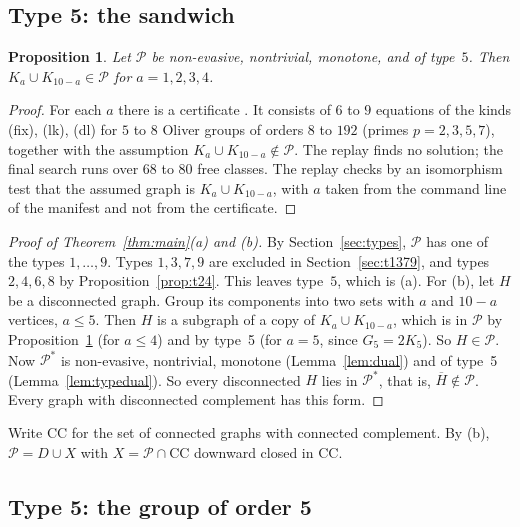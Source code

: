 \documentclass[11pt]{article}
\theoremstyle{plain}
\newtheorem{proposition}[theorem]{Proposition}
\theoremstyle{definition}
\theoremstyle{remark}
\newcommand{\PP}{\mathcal P}
\newcommand{\file}[1]{\path{#1}}
\begin{document}
\subsection{Type 5: the sandwich}\label{sec:t5}

\begin{proposition}\label{prop:A}
Let $\PP$ be non-evasive, nontrivial, monotone, and of type~$5$.
Then $K_a\cup K_{10-a}\in\PP$ for $a=1,2,3,4$.
\end{proposition}

\begin{proof}
For each $a$ there is a certificate \file{certs/type5_force_K<a>_K<10-a>.json}.
It consists of $6$ to $9$ equations of the kinds (fix), (lk), (dl) for $5$ to $8$ Oliver groups of orders $8$ to $192$ (primes $p=2,3,5,7$), together with the assumption $K_a\cup K_{10-a}\notin\PP$.
The replay finds no solution; the final search runs over $68$ to $80$ free classes.
The replay checks by an isomorphism test that the assumed graph is $K_a\cup K_{10-a}$, with $a$ taken from the command line of the manifest and not from the certificate.
\end{proof}

\begin{proof}[Proof of Theorem~\ref{thm:main}(a) and (b)]
By Section~\ref{sec:types}, $\PP$ has one of the types $1,\dots,9$. Types $1,3,7,9$ are excluded in Section~\ref{sec:t1379}, and types $2,4,6,8$ by Proposition~\ref{prop:t24}. This leaves type~$5$, which is (a).
For (b), let $H$ be a disconnected graph.
Group its components into two sets with $a$ and $10-a$ vertices, $a\le5$.
Then $H$ is a subgraph of a copy of $K_a\cup K_{10-a}$, which is in $\PP$ by Proposition~\ref{prop:A} (for $a\le4$) and by type~5 (for $a=5$, since $G_5=2K_5$).
So $H\in\PP$.
Now $\PP^*$ is non-evasive, nontrivial, monotone (Lemma~\ref{lem:dual}) and of type~5 (Lemma~\ref{lem:typedual}).
So every disconnected $H$ lies in $\PP^*$, that is, $\overline H\notin\PP$.
Every graph with disconnected complement has this form.
\end{proof}

Write $\mathrm{CC}$ for the set of connected graphs with connected complement.
By (b), $\PP=D\cup X$ with $X=\PP\cap\mathrm{CC}$ downward closed in $\mathrm{CC}$.

\subsection{Type 5: the group of order 5}\label{sec:z5}
\end{document}
